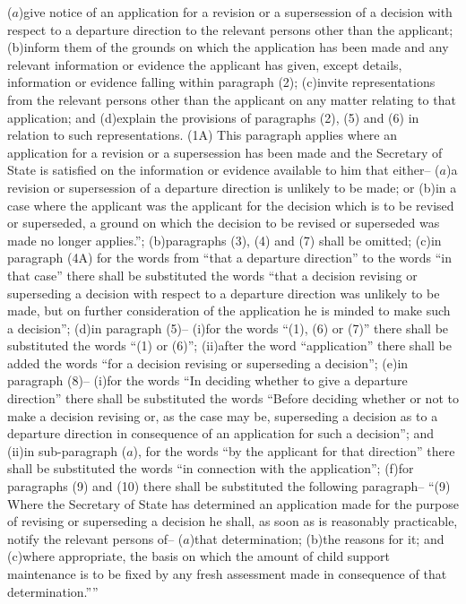 \documentclass[12pt,a4paper]{article}
\begin{document}
($a$)give notice of an application for a revision or a supersession of a decision with respect to a departure direction to the relevant persons other than the applicant;
(b)inform them of the grounds on which the application has been made and any relevant information or evidence the applicant has given, except details, information or evidence falling within paragraph (2);
(c)invite representations from the relevant persons other than the applicant on any matter relating to that application; and
(d)explain the provisions of paragraphs (2), (5) and (6) in relation to such representations.
(1A) This paragraph applies where an application for a revision or a supersession has been made and the Secretary of State is satisfied on the information or evidence available to him that either–
($a$)a revision or supersession of a departure direction is unlikely to be made; or
(b)in a case where the applicant was the applicant for the decision which is to be revised or superseded, a ground on which the decision to be revised or superseded was made no longer applies.”;
(b)paragraphs (3), (4) and (7) shall be omitted;
(c)in paragraph (4A) for the words from “that a departure direction” to the words “in that case” there shall be substituted the words “that a decision revising or superseding a decision with respect to a departure direction was unlikely to be made, but on further consideration of the application he is minded to make such a decision”;
(d)in paragraph (5)–
(i)for the words “(1), (6) or (7)” there shall be substituted the words “(1) or (6)”;
(ii)after the word “application” there shall be added the words “for a decision revising or superseding a decision”;
(e)in paragraph (8)–
(i)for the words “In deciding whether to give a departure direction” there shall be substituted the words “Before deciding whether or not to make a decision revising or, as the case may be, superseding a decision as to a departure direction in consequence of an application for such a decision”; and
(ii)in sub-paragraph ($a$), for the words “by the applicant for that direction” there shall be substituted the words “in connection with the application”;
(f)for paragraphs (9) and (10) there shall be substituted the following paragraph–
“(9) Where the Secretary of State has determined an application made for the purpose of revising or superseding a decision he shall, as soon as is reasonably practicable, notify the relevant persons of–
($a$)that determination;
(b)the reasons for it; and
(c)where appropriate, the basis on which the amount of child support maintenance is to be fixed by any fresh assessment made in consequence of that determination.””
\end{document}
